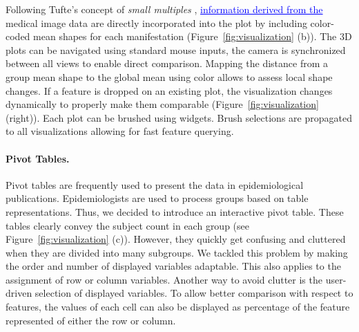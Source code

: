 \documentclass[journal]{style/vgtc} 			          %
\newcommand{\add}[1]{\textcolor{blue}{\uline{#1}}}
\begin{document}
%
Following Tufte's concept of \emph{small multiples} \cite{Tufte1983}, \add{information derived from the} medical image data are directly incorporated into the plot by including color-coded mean shapes for each manifestation (Figure~\ref{fig:visualization} (b)).
%
The 3D plots can be navigated using standard mouse inputs, the camera is synchronized between all views to enable direct comparison.
%
Mapping the distance from a group mean shape to the global mean using color allows to assess local shape changes.
If a feature is dropped on an existing plot, the visualization changes dynamically to properly make them comparable (Figure~\ref{fig:visualization} (right)).
%
Each plot can be brushed using widgets.
%
Brush selections are propagated to all visualizations allowing for fast feature querying.
%
%

\paragraph{Pivot Tables.}
Pivot tables are frequently used to present the data in epidemiological publications.
%
Epidemiologists are used to process groups based on table representations.
%
Thus, we decided to introduce an interactive pivot table.
%
These tables clearly convey the subject count in each group (see Figure~\ref{fig:visualization} (c)).
%
However, they quickly get confusing and cluttered when they are divided into many subgroups.
%
We tackled this problem by making the order and number of displayed variables adaptable.
%
This also applies to the assignment of row or column variables.
%
Another way to avoid clutter is the user-driven selection of displayed variables.
%
To allow better comparison with respect to features, the values of each cell can also be displayed as percentage of the feature represented of either the row or column.
\end{document}
